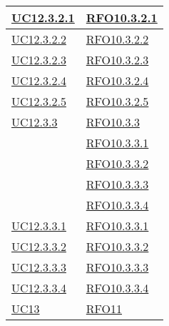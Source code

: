 \begin{longtable}{|>{\centering}m{5cm}|m{5cm}<{\centering}|}
\hyperlink{UC12.3.2.1}{UC12.3.2.1} & \hyperlink{RFO10.3.2.1}{RFO10.3.2.1}\\\hline
\hyperlink{UC12.3.2.2}{UC12.3.2.2} & \hyperlink{RFO10.3.2.2}{RFO10.3.2.2}\\\hline
\hyperlink{UC12.3.2.3}{UC12.3.2.3} & \hyperlink{RFO10.3.2.3}{RFO10.3.2.3}\\\hline
\hyperlink{UC12.3.2.4}{UC12.3.2.4} & \hyperlink{RFO10.3.2.4}{RFO10.3.2.4}\\\hline
\hyperlink{UC12.3.2.5}{UC12.3.2.5} & \hyperlink{RFO10.3.2.5}{RFO10.3.2.5}\\\hline

\hyperlink{UC12.3.3}{UC12.3.3}
& \hyperlink{RFO10.3.3}{RFO10.3.3}\\
& \hyperlink{RFO10.3.3.1}{RFO10.3.3.1}\\
& \hyperlink{RFO10.3.3.2}{RFO10.3.3.2}\\
& \hyperlink{RFO10.3.3.3}{RFO10.3.3.3}\\
& \hyperlink{RFO10.3.3.4}{RFO10.3.3.4}\\\hline

\hyperlink{UC12.3.3.1}{UC12.3.3.1} & \hyperlink{RFO10.3.3.1}{RFO10.3.3.1}\\\hline
\hyperlink{UC12.3.3.2}{UC12.3.3.2} & \hyperlink{RFO10.3.3.2}{RFO10.3.3.2}\\\hline
\hyperlink{UC12.3.3.3}{UC12.3.3.3} & \hyperlink{RFO10.3.3.3}{RFO10.3.3.3}\\\hline
\hyperlink{UC12.3.3.4}{UC12.3.3.4} & \hyperlink{RFO10.3.3.4}{RFO10.3.3.4}\\\hline

\hyperlink{UC13}{UC13} & \hyperlink{RFO11}{RFO11}\\\hline


\end{longtable}
